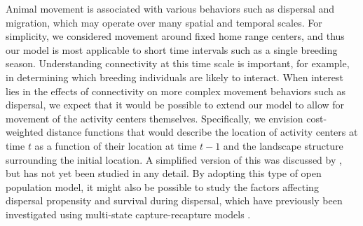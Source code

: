 \documentclass[12pt]{article}
\begin{document}
\begin{spacing}{1.8}
Animal movement is associated with various behaviors such as dispersal and
migration, which may operate over many spatial and temporal
scales. For simplicity, we considered movement around
fixed home range centers, and thus our model is most applicable to
short time intervals such as a single breeding season. Understanding
connectivity at this time scale is important, for example, in
determining which breeding individuals are likely to interact. When
interest lies in the effects of connectivity on more complex movement
behaviors such as dispersal, we expect that it
would be possible to extend our model to allow for movement of the
activity centers themselves. Specifically, we envision cost-weighted
distance functions that would describe the location of activity
centers at time $t$ as a function of their location at time $t-1$ and
the landscape structure surrounding the initial location. A simplified
version of this was discussed by \citet{gardner_etal:2010ecol}, but has
not yet been studied in any detail. By adopting
this type of open population model, it might also be possible to study
the factors affecting dispersal propensity and survival during
dispersal, which have previously been investigated using multi-state
capture-recapture models \citep{kendall_nichols:2004}.

\end{spacing}
\end{document}
